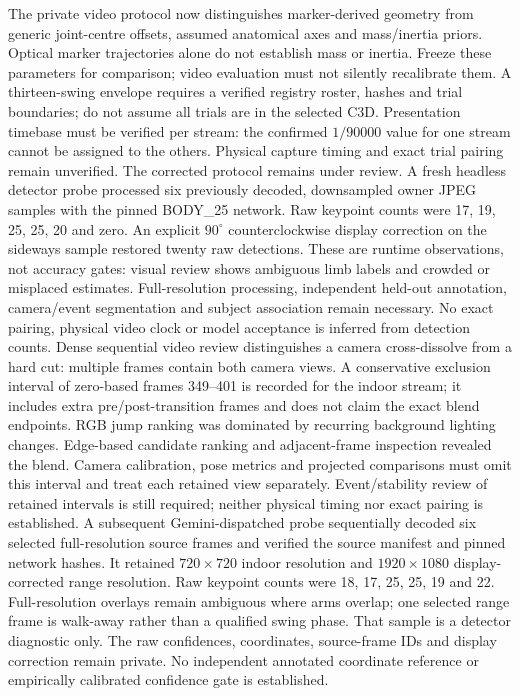 \documentclass[11pt,a4paper]{article}
\begin{document}
The private video protocol now distinguishes marker-derived geometry
from generic joint-centre offsets, assumed anatomical axes and mass/inertia
priors. Optical marker trajectories alone do not establish mass or
inertia. Freeze these parameters for comparison; video evaluation must
not silently recalibrate them. A thirteen-swing envelope requires a
verified registry roster, hashes and trial boundaries; do not assume all
trials are in the selected C3D. Presentation timebase must be verified
per stream: the confirmed $1/90000$ value for one stream cannot be
assigned to the others. Physical capture timing and exact trial pairing
remain unverified. The corrected protocol remains under review.
A fresh headless detector probe processed six previously decoded,
downsampled owner JPEG samples with the pinned BODY\_25 network. Raw
keypoint counts were 17, 19, 25, 25, 20 and zero. An explicit
$90^\circ$ counterclockwise display correction on the sideways sample
restored twenty raw detections. These are runtime observations, not
accuracy gates: visual review shows ambiguous limb labels and crowded
or misplaced estimates. Full-resolution processing, independent
held-out annotation, camera/event segmentation and subject association
remain necessary. No exact pairing, physical video clock or model
acceptance is inferred from detection counts.
Dense sequential video review distinguishes a camera cross-dissolve
from a hard cut: multiple frames contain both camera views. A
conservative exclusion interval of zero-based frames 349--401 is recorded
for the indoor stream; it includes extra pre/post-transition frames and
does not claim the exact blend endpoints. RGB jump ranking was dominated
by recurring background lighting changes. Edge-based candidate ranking
and adjacent-frame inspection revealed the blend. Camera calibration,
pose metrics and projected comparisons must omit this interval and treat
each retained view separately. Event/stability review of retained
intervals is still required; neither physical timing nor exact pairing
is established.
A subsequent Gemini-dispatched probe sequentially decoded six selected
full-resolution source frames and verified the source manifest and pinned
network hashes. It retained $720\times720$ indoor resolution and
$1920\times1080$ display-corrected range resolution. Raw keypoint counts
were 18, 17, 25, 25, 19 and 22. Full-resolution overlays remain ambiguous
where arms overlap; one selected range frame is walk-away rather than a
qualified swing phase. That sample is a detector diagnostic only. The
raw confidences, coordinates, source-frame IDs and display correction
remain private. No independent annotated coordinate reference or
empirically calibrated confidence gate is established.
\end{document}
